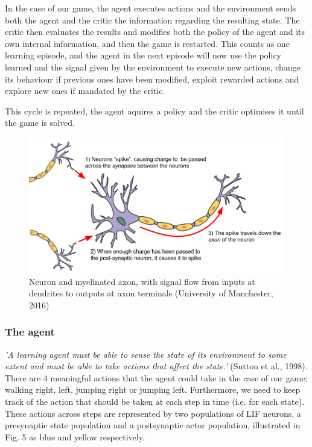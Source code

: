 \documentclass[10pt]{article}
\begin{document}
    In the case of our game, the agent executes actions and the environment sends both the agent and the critic the information regarding the resulting state. The critic then evaluates the results and modifies both the policy of the agent and its own internal information, and then the game is restarted. This counts as one learning episode, and the agent in the next episode will now use the policy learned and the signal given by the environment to execute new actions, change its behaviour if previous ones have been modified, exploit rewarded actions and explore new ones if mandated by the critic. 
    
    This cycle is repeated, the agent aquires a policy and the critic optimises it until the game is solved.

    \begin{figure}
    \center
    \includegraphics[width=140mm]{./neurons.png}
    \caption{Neuron and myelinated axon, with signal flow from inputs at dendrites to outputs at axon terminals (University of Manchester, 2016)}
    \end{figure}

    \subsubsection{The agent}

    \textit{'A learning agent must be able to sense the state of its environment to some extent and must be able to take actions that affect the state.'} (Sutton et al., 1998). There are 4 meaningful actions that the agent could take in the case of our game: walking right, left, jumping right or jumping left. Furthermore, we need to keep track of the action that should be taken at each step in time (i.e. for each state). These actions across steps are represented by two populations of LIF neurons, a presynaptic state population and a postsynaptic actor population, illustrated in Fig. 5 as blue and yellow respectively.
\end{document}
